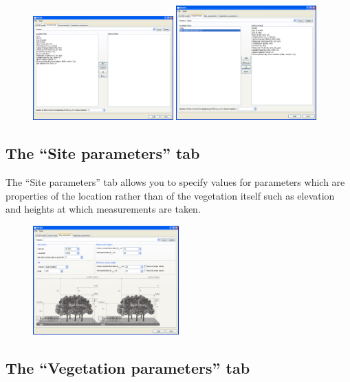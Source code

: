 \documentclass[10pt,a4paper]{article}
\begin{document}
\begin{figure}[!htb]
\centering
\includegraphics[width=0.48\textwidth]{images/ss/input-format-panel}
\includegraphics[width=0.48\textwidth]{images/ss/input-format-panel-filled}
\end{figure}


\subsection{The ``Site parameters'' tab}

The ``Site parameters'' tab allows you to specify values for parameters which are properties of the 
location rather than of the vegetation itself such as elevation and heights at which measurements 
are taken.

\begin{figure}[!htb]
\centering
\includegraphics[width=0.5\textwidth]{images/ss/site-params-panel}
\end{figure}


\subsection{The ``Vegetation parameters'' tab}
\end{document}
